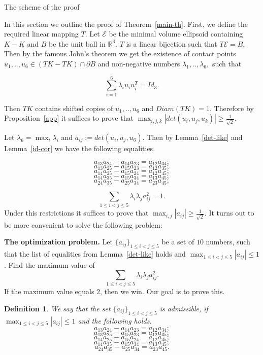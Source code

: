 \documentclass[12pt]{article}
\newtheorem{definition}{Definition}[section]
\begin{document}
\begin{section}{The scheme of the proof}

    In this section we outline the proof of Theorem~\ref{main-th}.
        First, we define the required linear mapping $T$. Let $\mathcal{E}$ be the minimal volume ellipsoid containing $K-K$  and $B$ be the unit ball in $\mathbb{R}^{3}.$ $T$ is a linear bijection such that $T\mathcal{E} = B.$ Then by the famous John's theorem we get the existence of contact points $u_{1},..,u_{6}\in (TK-TK)\cap \partial B$ and non-negative numbers $\lambda_{1},..,\lambda_{6}, $ such that 

         $$
            \sum_{i=1}^{6}\lambda_{i}u_{i}u_{i}^{T} = Id_{3}.
        $$

        Then $TK$ contains shifted copies of $u_{1},..,u_{6}$ and $Diam(TK)=1$. Therefore by Proposition~\ref{app} it suffices to prove that $\max_{i,j,k}|det(u_{i},u_{j},u_{k})|\geq \frac{1}{\sqrt{2}}.$ 

        Let $\lambda_{6} = \max_{i}\lambda_{i}$ and  $a_{ij}:=det(u_{i},u_{j},u_{6}).$ Then by Lemma~\ref{det-like} and Lemma~\ref{id-cor} we have the following equalities. 

        $$
            a_{13}a_{24} - a_{14}a_{23} = a_{12}a_{34};
        $$
        $$
            a_{13}a_{25} - a_{15}a_{23} = a_{12}a_{35};
        $$
        $$
            a_{14}a_{25} - a_{15}a_{24} = a_{12}a_{45};
        $$
        $$
            a_{14}a_{35} - a_{15}a_{34} = a_{13}a_{45};
        $$
        $$
            a_{24}a_{35} - a_{25}a_{34} = a_{23}a_{45};
        $$

        $$
            \sum_{1\leq i<j\leq 5} \lambda_{i}\lambda_{j}a_{ij}^2= 1.
        $$
        Under this restrictions it suffices to prove that $\max_{i,j}|a_{ij}|\geq \frac{1}{\sqrt{2}}.$ It turns out to be more convenient to solve the following problem:

        \textbf{The optimization problem.} Let $\{a_{ij}\}_{1\leq i<j\leq 5}$ be a set of $10$ numbers, such that the list of equalities from Lemma~\ref{det-like} holds and $\max_{1\leq i<j\leq 5} |a_{ij}| \leq 1$. Find the maximum value of $$\sum_{1\leq i<j\leq 5}\lambda_{i}\lambda_{j}a_{ij}^2.$$ 
        If the maximum value equals $2$, then we win. Our goal is to prove this. 
        
    
    

    
    \begin{definition}
        We say that the set $\{a_{ij}\}_{1\leq i<j\leq 5}$ is admissible, if  $\max_{1\leq i<j\leq 5} |a_{ij}| \leq 1$ and the following holds.
        $$
            a_{13}a_{24} - a_{14}a_{23} = a_{12}a_{34};
        $$
        $$
            a_{13}a_{25} - a_{15}a_{23} = a_{12}a_{35};
        $$
        $$
            a_{14}a_{25} - a_{15}a_{24} = a_{12}a_{45};
        $$
        $$
            a_{14}a_{35} - a_{15}a_{34} = a_{13}a_{45};
        $$
        $$
            a_{24}a_{35} - a_{25}a_{34} = a_{23}a_{45}.
        $$
    

\end{definition}
\end{section}
\end{document}
